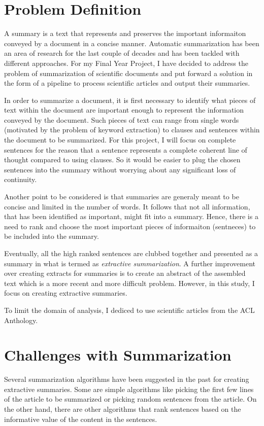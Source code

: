 \section{Problem Definition}
A summary is a text that represents and preserves the important informaiton conveyed by a document in a concise manner.
Automatic summarization has been an area of research for the last couple of decades and has been tackled with different approaches.
For my Final Year Project, I have decided to address the problem of summarization of scientific documents and put forward a solution in the form of a pipeline to process scientific articles and output their summaries.

In order to summarize a document, it is first necessary to identify what pieces of text within the document are important enough to represent the information conveyed by the document.
Such pieces of text can range from single words (motivated by the problem of keyword extraction) to clauses and sentences within the document to be summarized.
For this project, I will focus on complete sentences for the reason that a sentence represents a complete coherent line of thought compared to using clauses.
So it would be easier to plug the chosen sentences into the summary without worrying about any significant loss of continuity.

Another point to be considered is that summaries are generaly meant to be concise and limited in the number of words.
It follows that not all information, that has been identified as important, might fit into a summary.
Hence, there is a need to rank and choose the most important pieces of informaiton (sentneces) to be included into the summary.

Eventually, all the high ranked sentences are clubbed together and presented as a summary in what is termed as \textit{extractive summarization}.
A further improvement over creating extracts for summaries is to create an abstract of the assembled text which is a more recent and more difficult problem.
However, in this study, I focus on creating extractive summaries.

To limit the domain of analysis, I dediced to use scientific articles from the ACL Anthology.

\section{Challenges with Summarization}
Several summarization algorithms have been suggested in the past for creating extractive summaries.
Some are simple algorithms like picking the first few lines of the article to be summarized or picking random sentences from the article.
On the other hand, there are other algorithms that rank sentences based on the informative value of the content in the sentences.

